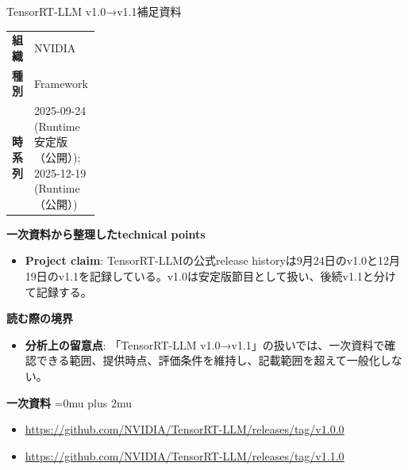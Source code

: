 \begin{technicalnote}{TensorRT-LLM v1.0→v1.1}{補足資料}
\begingroup
\begin{tabularx}{\linewidth}{@{}>{\bfseries}p{0.22\linewidth}X@{}}
組織 & NVIDIA \\
種別 & Framework \\
時系列 & 2025-09-24 (Runtime安定版（公開）); 2025-12-19 (Runtime（公開）) \\
\end{tabularx}
\smallskip
{\bfseries 一次資料から整理したtechnical points}
\begin{itemize}[leftmargin=1.5em,itemsep=0.35em]
\item \textbf{Project claim}: TensorRT-LLMの公式release historyは9月24日のv1.0と12月19日のv1.1を記録している。v1.0は安定版節目として扱い、後続v1.1と分けて記録する。
\end{itemize}
\begin{minipage}{\linewidth}
{\bfseries 読む際の境界}
\begin{itemize}[leftmargin=1.5em,itemsep=0.35em]
\item \textbf{分析上の留意点}: 「TensorRT-LLM v1.0→v1.1」の扱いでは、一次資料で確認できる範囲、提供時点、評価条件を維持し、記載範囲を超えて一般化しない。
\end{itemize}
\begin{samepage}
{\bfseries 一次資料}
\begingroup\sloppy
\Urlmuskip=0mu plus 2mu\relax
\begin{itemize}[leftmargin=1.5em,itemsep=0.25em]
\item {\scriptsize\url{https://github.com/NVIDIA/TensorRT-LLM/releases/tag/v1.0.0}}
\item {\scriptsize\url{https://github.com/NVIDIA/TensorRT-LLM/releases/tag/v1.1.0}}
\end{itemize}
\endgroup
\end{samepage}
\end{minipage}
\endgroup
\end{technicalnote}
\medskip

